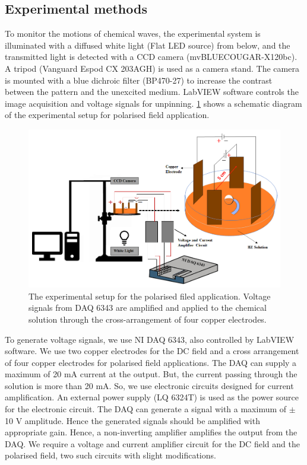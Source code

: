 \documentclass[journal=jacsat,manuscript=article]{achemso}
\begin{document}
\subsection{Experimental methods}
To monitor the motions of chemical waves, the experimental system is
illuminated with a diffused white light (Flat LED source) from below,
and the transmitted light is detected with a CCD camera
(mvBLUECOUGAR-X120bc). A tripod (Vanguard Espod CX 203AGH) is used as
a camera stand. The camera is mounted with a blue dichroic filter
(BP470-27) to increase the contrast between the pattern and the
unexcited medium.  LabVIEW software controls the image acquisition and
voltage signals for unpinning. \ref{fig:ex1} shows a schematic
diagram of the experimental setup for polarised field application.
\begin{figure}[H]
    \centering
    \includegraphics[width=\linewidth]{experiment_setup_01.png}
    \caption{The experimental setup for the polarised filed
      application. Voltage signals from DAQ 6343 are amplified and
      applied to the chemical solution through the cross-arrangement
      of four copper electrodes. }
    \label{fig:ex1}
\end{figure}
To generate voltage signals, we use NI DAQ 6343, also controlled by
LabVIEW software.  We use two copper electrodes for the DC field and a
cross arrangement of four copper electrodes for polarised field
applications. The DAQ can supply a maximum of 20 mA current at the
output. But, the current passing through the solution is more than 20
mA. So, we use electronic circuits designed for current
amplification. An external power supply (LQ 6324T) is used as the
power source for the electronic circuit. The DAQ can generate a signal
with a maximum of $\pm$ 10 V amplitude. Hence the generated signals
should be amplified with appropriate gain. Hence, a non-inverting
amplifier amplifies the output from the DAQ. We require a voltage and
current amplifier circuit for the DC field and the polarised field,
two such circuits with slight modifications.
\end{document}
